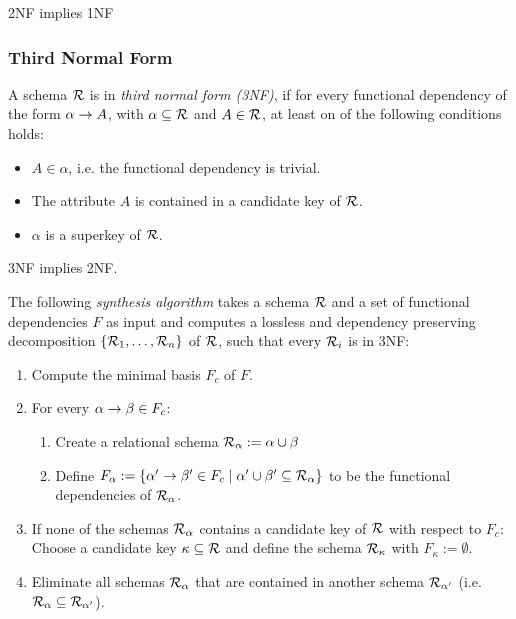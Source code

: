 \begin{note}
2NF implies 1NF
\end{note}




\subsubsection{Third Normal Form}

A schema $\mathcal{R}$ is in \emph{third normal form (3NF)}, if for every functional dependency of the form $\alpha \rightarrow A$, with $\alpha \subseteq \mathcal{R}$ and $A \in \mathcal{R}$, at least on of the following conditions holds:
\begin{itemize}
\item $A \in \alpha$, i.e. the functional dependency is trivial.
\item The attribute $A$ is contained in a candidate key of $\mathcal{R}$.
\item $\alpha$ is a superkey of $\mathcal{R}$.
\end{itemize}

\begin{note}
3NF implies 2NF.
\end{note}

The following \emph{synthesis algorithm} takes a schema $\mathcal{R}$ and a set of functional dependencies $F$ as input and computes a lossless and dependency preserving decomposition $\{\mathcal{R}_1,\ldots,\mathcal{R}_n\}$ of $\mathcal{R}$, such that every $\mathcal{R}_i$ is in 3NF:
\begin{enumerate}
\item
	Compute the minimal basis $F_c$ of $F$.
\item
	For every $\alpha \rightarrow \beta \in F_c$:
	\begin{enumerate}
	\item Create a relational schema $\mathcal{R}_\alpha := \alpha \cup \beta$
	\item Define $F_\alpha := \{ \alpha' \rightarrow \beta' \in F_c \mid \alpha' \cup \beta' \subseteq \mathcal{R}_\alpha \}$ to be the functional dependencies of $\mathcal{R}_\alpha$.
	\end{enumerate}
\item
	If none of the schemas $\mathcal{R}_\alpha$ contains a candidate key of $\mathcal{R}$ with respect to $F_c$: Choose a candidate key $\kappa \subseteq \mathcal{R}$ and define the schema $\mathcal{R}_\kappa$ with $F_\kappa := \emptyset$.
\item
	Eliminate all schemas $\mathcal{R}_\alpha$ that are contained in another schema $\mathcal{R}_{\alpha'}$ (i.e. $\mathcal{R}_\alpha \subseteq \mathcal{R}_{\alpha'}$).
\end{enumerate}


